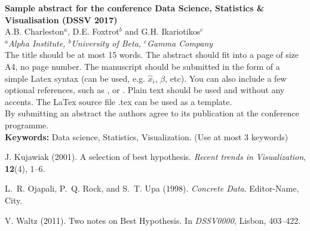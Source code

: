 
\setlength{\textwidth}{160mm}\setlength{\textheight}{240mm}
\setlength{\oddsidemargin}{0mm}\setlength{\evensidemargin}{0mm}
\setlength{\topmargin}{-10mm}
\setlength{\parindent}{0mm} 
\pagestyle{empty}	%



{\Large\bf Sample abstract for the conference Data Science, Statistics \& Visualisation (DSSV 2017) }\\[4mm]

A.B. Charleston$^a$, D.E. Foxtrot$^b$ and G.H. Ikariotikos$^c$\\ 				

{\small \em $^a$Alpha Institute, $^b$University of Beta, $^c$Gamma 
Company}\\[3mm]


The title should be at most 15 words.
The abstract should fit into a page of size A4, no page number. The manuscript should be submitted in the 
form of a simple Latex syntax (can be used, e.g. $\hat{x}_i$, $\beta$, etc). You can also 
include a few optional references, such as \cite{journal01}, \cite{book98} or \cite{procc11}. Plain text should be used and without any accents. The LaTex source file .tex can be used as a 
template.\\

By submitting an abstract the authors agree to its publication at 
the conference programme.\\

\textbf{Keywords:} Data science, Statistics, Visualization. (Use at most 3 keywords)

\begin{thebibliography}{00}
 J. Kujawiak (2001). A selection of best hypothesis. \emph{Recent trends in Visualization}, \textbf{12}(4), 1--6.

L.~R. Ojapali, P.~Q. Rock, and S.~T. Upa (1998). \emph{Concrete Data}. Editor-Name, City.

 V. Waltz (2011). Two notes on Best Hypothesis. In \emph{DSSV0000}, Lisbon, 403--422.
\end{thebibliography}



